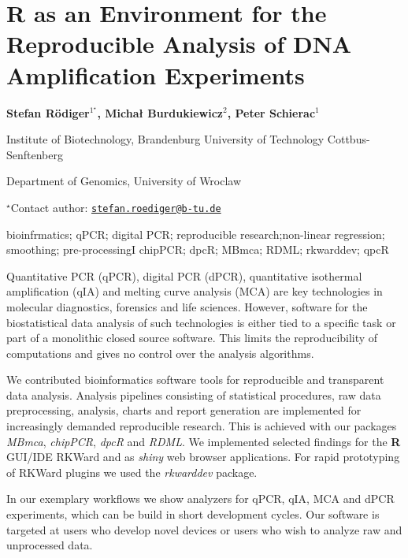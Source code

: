 \documentclass[\main/boa.tex]{subfiles}
\begin{document}
\section{R as an Environment for the Reproducible Analysis of DNA Amplification
Experiments}

\begin{center}
  {\bf {} Stefan Rödiger$^{1^\star}$,  Michał Burdukiewicz$^{2}$,  Peter Schierac$^{1}$}
\end{center}

\vskip 0.3cm

\begin{affiliations}
\begin{enumerate}
\begin{minipage}{0.915\textwidth}
\centering
\item Institute of Biotechnology, Brandenburg University of Technology
Cottbus-Senftenberg \\[-2pt]
\item Department of Genomics, University of Wroclaw \\[-2pt]
\end{minipage}
\end{enumerate}
$^\star$Contact author: \href{mailto:stefan.roediger@b-tu.de}{\nolinkurl{stefan.roediger@b-tu.de}}\\
\end{affiliations}

\vskip 0.5cm

\begin{minipage}{0.915\textwidth}
\keywords bioinfrmatics; qPCR; digital PCR; reproducible research;non-linear
regression; smoothing; pre-processingI
\packages {} chipPCR;  dpcR;  MBmca;  RDML;  rkwarddev;  qpcR
\end{minipage}

\vskip 0.8cm

Quantitative PCR (qPCR), digital PCR (dPCR), quantitative isothermal
amplification (qIA) and melting curve analysis (MCA) are key
technologies in molecular diagnostics, forensics and life sciences.
However, software for the biostatistical data analysis of such
technologies is either tied to a specific task or part of a monolithic
closed source software. This limits the reproducibility of computations
and gives no control over the analysis algorithms.

We contributed bioinformatics software tools for reproducible and
transparent data analysis. Analysis pipelines consisting of statistical
procedures, raw data preprocessing, analysis, charts and report
generation are implemented for increasingly demanded reproducible
research. This is achieved with our packages \emph{MBmca},
\emph{chipPCR}, \emph{dpcR} and \emph{RDML}. We implemented selected
findings for the \textbf{R} GUI/IDE RKWard and as \emph{shiny} web
browser applications. For rapid prototyping of RKWard plugins we used
the \emph{rkwarddev} package.

In our exemplary workflows we show analyzers for qPCR, qIA, MCA and dPCR
experiments, which can be build in short development cycles. Our
software is targeted at users who develop novel devices or users who
wish to analyze raw and unprocessed data.
\end{document}
